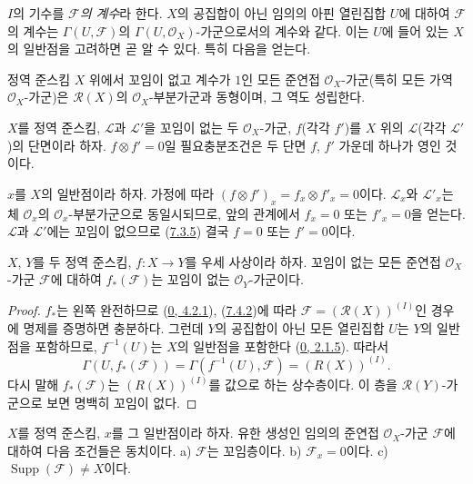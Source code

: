 $I$의 기수를 \emph{$\mathscr{F}$의 계수}라 한다. $X$의
공집합이 아닌 임의의 아핀 열린집합 $U$에 대하여 $\mathscr{F}$의
계수는 $\Gamma(U,\mathscr{F})$의 $\Gamma(U,\mathscr{O}_X)$-가군으로서의
계수와 같다. 이는 $U$에 들어 있는 $X$의 일반점을 고려하면 곧 알 수
있다. 특히 다음을 얻는다.

\begin{corollary}[7.4.3]
\label{I.7.4.3-ko}
정역 준스킴 $X$ 위에서 꼬임이 없고 계수가 $1$인 모든 준연접
$\mathscr{O}_X$-가군(특히 모든 가역 $\mathscr{O}_X$-가군)은
$\mathscr{R}(X)$의 $\mathscr{O}_X$-부분가군과 동형이며, 그 역도
성립한다.
\end{corollary}

\begin{corollary}[7.4.4]
\label{I.7.4.4-ko}
$X$를 정역 준스킴, $\mathscr{L}$과 $\mathscr{L}'$을 꼬임이 없는 두
$\mathscr{O}_X$-가군, $f$(각각 $f'$)를 $X$ 위의
$\mathscr{L}$(각각 $\mathscr{L}'$)의 단면이라 하자.
$f\otimes f'=0$일 필요충분조건은 두 단면 $f$, $f'$ 가운데 하나가
영인 것이다.
\end{corollary}

$x$를 $X$의 일반점이라 하자. 가정에 따라
$(f\otimes f')_x=f_x\otimes f'_x=0$이다. $\mathscr{L}_x$와
$\mathscr{L}'_x$는 체 $\mathscr{O}_x$의 $\mathscr{O}_x$-부분가군으로
동일시되므로, 앞의 관계에서 $f_x=0$ 또는 $f'_x=0$을 얻는다.
$\mathscr{L}$과 $\mathscr{L}'$에는 꼬임이 없으므로
(\hyperref[I.7.3.5-ko]{7.3.5}) 결국 $f=0$ 또는 $f'=0$이다.

\begin{proposition}[7.4.5]
\label{I.7.4.5-ko}
$X$, $Y$를 두 정역 준스킴, $f:X\to Y$를 우세 사상이라 하자.
꼬임이 없는 모든 준연접 $\mathscr{O}_X$-가군 $\mathscr{F}$에 대하여
$f_*(\mathscr{F})$는 꼬임이 없는 $\mathscr{O}_Y$-가군이다.
\end{proposition}

\begin{proof}
$f_*$는 왼쪽 완전하므로
(\hyperref[0.4.2.1-ko]{0, 4.2.1}),
(\hyperref[I.7.4.2-ko]{7.4.2})에 따라
$\mathscr{F}=(\mathscr{R}(X))^{(I)}$인 경우에 명제를 증명하면 충분하다.
그런데 $Y$의 공집합이 아닌 모든 열린집합 $U$는 $Y$의 일반점을
포함하므로, $f^{-1}(U)$는 $X$의 일반점을 포함한다
(\hyperref[0.2.1.5-ko]{0, 2.1.5}). 따라서
\[
  \Gamma(U,f_*(\mathscr{F}))
  =\Gamma(f^{-1}(U),\mathscr{F})=(R(X))^{(I)}.
\]
다시 말해 $f_*(\mathscr{F})$는 $(R(X))^{(I)}$를 값으로 하는
상수층이다. 이 층을 $\mathscr{R}(Y)$-가군으로 보면 명백히 꼬임이
없다.
\end{proof}

\begin{proposition}[7.4.6]
\label{I.7.4.6-ko}
$X$를 정역 준스킴, $x$를 그 일반점이라 하자. 유한 생성인 임의의
준연접 $\mathscr{O}_X$-가군 $\mathscr{F}$에 대하여 다음 조건들은
동치이다. a) $\mathscr{F}$는 꼬임층이다. b) $\mathscr{F}_x=0$이다.
c) $\operatorname{Supp}(\mathscr{F})\neq X$이다.
\end{proposition}


